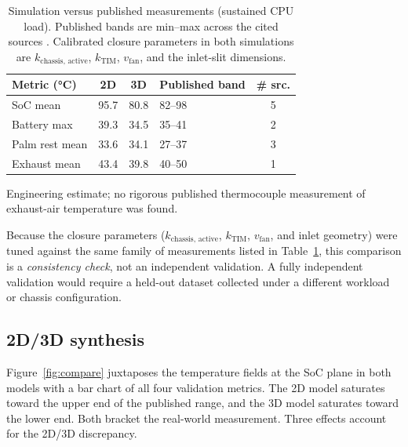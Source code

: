 \documentclass[10pt,twocolumn,letterpaper]{article}
\newcommand{\kchas}{k_{\mathrm{chassis,\,active}}}
\newcommand{\kTIM}{k_{\mathrm{TIM}}}
\newcommand{\vfan}{v_{\mathrm{fan}}}
\begin{document}
\begin{table}[!tbp]
  \centering
  \caption{Simulation versus published measurements (sustained CPU
           load). Published bands are min--max across the cited
           sources \cite{notebookcheck2019,notebookcheck2021pro,%
           notebookcheck2021max,toms2021,appleinsider2019,laptopmedia2021}.
           Calibrated closure parameters in both simulations are
           $\kchas$, $\kTIM$, $\vfan$, and the inlet-slit
           dimensions.}
  \label{tab:valid}
  \small
  \begin{threeparttable}
  \begin{tabularx}{\columnwidth}{@{}lccXc@{}}
    \toprule
    Metric (\si{\celsius}) & 2D  & 3D  & Published band       & \# src. \\
    \midrule
    SoC mean               & 95.7 & 80.8 & 82--98               & 5 \\
    Battery max            & 39.3 & 34.5 & 35--41               & 2 \\
    Palm rest mean         & 33.6 & 34.1 & 27--37               & 3 \\
    Exhaust mean           & 43.4 & 39.8 & 40--50\tnote{$\ddag$} & 1 \\
    \bottomrule
  \end{tabularx}
  \begin{tablenotes}\footnotesize
  \item[$\ddag$] Engineering estimate; no rigorous published
    thermocouple measurement of exhaust-air temperature was found.
  \end{tablenotes}
  \end{threeparttable}
\end{table}

\vspace{6pt}

Because the closure parameters ($\kchas$, $\kTIM$, $\vfan$, and
inlet geometry) were tuned against the same family of
measurements listed in Table~\ref{tab:valid}, this comparison is a
\emph{consistency check}, not an independent validation. A fully
independent validation would require a held-out dataset collected
under a different workload or chassis configuration.

\subsection{2D/3D synthesis}
\label{sec:synthesis}

Figure~\ref{fig:compare} juxtaposes the temperature fields at the
SoC plane in both models with a bar chart of all four validation
metrics. The 2D model saturates toward the upper end of the
published range, and the 3D model saturates toward the lower end.
Both bracket the real-world measurement. Three effects account for
the 2D/3D discrepancy.
\end{document}
